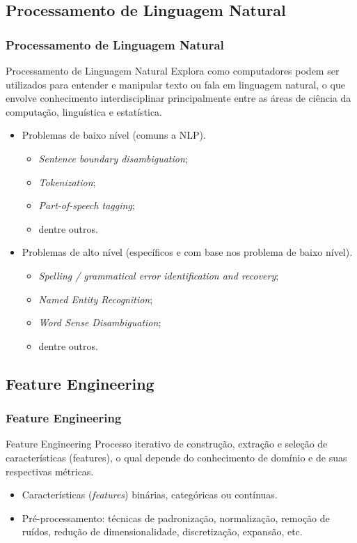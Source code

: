 \documentclass{beamer}
\begin{document}
\subsection{Processamento de Linguagem Natural}
\begin{frame}
\frametitle{Processamento de Linguagem Natural}
\begin{block}{{Processamento de Linguagem Natural}}
Explora como computadores podem ser utilizados para entender e manipular texto ou fala em linguagem natural, o que envolve conhecimento interdisciplinar principalmente entre as áreas de ciência da computação, linguística e estatística.
\end{block}
\begin{multicols}{2}
\begin{itemize}
\item Problemas de baixo nível (comuns a NLP).
\begin{itemize}
\item \textit{Sentence boundary disambiguation};
\item \textit{Tokenization};
\item \textit{Part-of-speech tagging};
\item dentre outros.
\end{itemize}
\end{itemize}

\columnbreak

\begin{itemize}
\item Problemas de alto nível (específicos e com base nos problema de baixo nível).
\begin{itemize}
\item \textit{Spelling / grammatical error identification and recovery};
\item \textit{Named Entity Recognition};
\item \textit{Word Sense Disambiguation};
\item dentre outros.
\end{itemize}
\end{itemize}
\end{multicols}
\end{frame}
\subsection{Feature Engineering}
\begin{frame}
\frametitle{Feature Engineering}
\begin{block}{Feature Engineering}
Processo iterativo de construção, extração e seleção de características (features), o qual depende do conhecimento de domínio e de suas respectivas métricas.
\end{block}
\begin{itemize}
\item Características (\textit{features}) binárias, categóricas ou contínuas.
\item Pré-processamento: técnicas de padronização, normalização, remoção de ruídos, redução de dimensionalidade, discretização, expansão, etc.
\end{itemize}
\end{frame}
\end{document}
